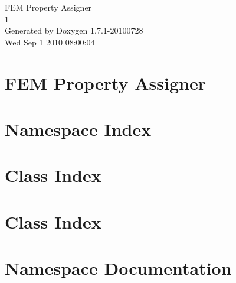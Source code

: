 \documentclass[a4paper]{book}
\begin{document}
\hypersetup{pageanchor=false}
\begin{titlepage}
\vspace*{7cm}
\begin{center}
{\Large FEM Property Assigner \\[1ex]\large 1 }\\
\vspace*{1cm}
{\large Generated by Doxygen 1.7.1-20100728}\\
\vspace*{0.5cm}
{\small Wed Sep 1 2010 08:00:04}\\
\end{center}
\end{titlepage}
\clearemptydoublepage
{}
\tableofcontents
\clearemptydoublepage
{}
\hypersetup{pageanchor=true}
\chapter{FEM Property Assigner}
\label{index}\hypertarget{index}{}
\chapter{Namespace Index}

\chapter{Class Index}

\chapter{Class Index}

\chapter{Namespace Documentation}






\end{document}
